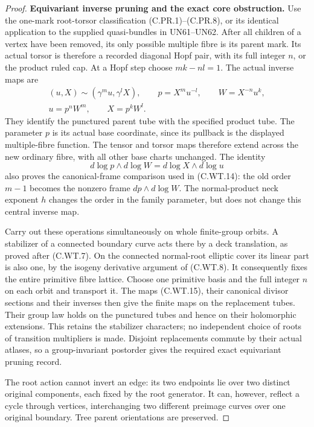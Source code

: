 \begin{proof}
\par\medskip\noindent\textbf{Equivariant inverse pruning and the exact core obstruction.}
Use the one-mark root-torsor classification
(C.PR.1)--(C.PR.8), or its identical application
to the supplied quasi-bundles in UN61--UN62.
After all children of a vertex have been
removed, its only possible multiple fibre
is its parent mark. Its actual torsor is
therefore a recorded diagonal Hopf pair,
with its full integer \(n\), or the product
ruled cap. At a Hopf step choose
\(mk-nl=1\). The actual inverse maps are
\[
 \begin{gathered}
 (u,X)\sim(\gamma^m u,\gamma^lX),\qquad
 p=X^m u^{-l},\qquad W=X^{-n}u^k,\\
                       u=p^nW^m,\qquad X=p^kW^l.
 \end{gathered}
 \tag{C.WT.15}
\]
They identify the punctured parent tube
with the specified product tube. The
parameter \(p\) is its actual base
coordinate, since its pullback is the
displayed multiple-fibre function.
The tensor and torsor maps therefore
extend across the new ordinary fibre,
with all other base charts unchanged.
The identity
\[
             d\log p\wedge d\log W
                         =d\log X\wedge d\log u
 \tag{C.WT.16}
\]
also proves the canonical-frame comparison
used in (C.WT.14): the old order \(m-1\)
becomes the nonzero frame \(dp\wedge
d\log W\). The normal-product neck
exponent \(h\) changes the order in the
family parameter, but does not change
this central inverse map.

Carry out these operations simultaneously
on whole finite-group orbits. A stabilizer
of a connected boundary curve acts there
by a deck translation, as proved after
(C.WT.7). On the connected normal-root
elliptic cover its linear part is also
one, by the isogeny derivative argument
of (C.WT.8). It consequently fixes the
entire primitive fibre lattice. Choose
one primitive basis and the full integer
\(n\) on each orbit and transport it.
The maps (C.WT.15), their canonical
divisor sections and their inverses
then give the finite maps on the
replacement tubes. Their group law
holds on the punctured tubes and hence
on their holomorphic extensions.
This retains the stabilizer characters;
no independent choice of roots of
transition multipliers is made.
Disjoint replacements commute by their
actual atlases, so a group-invariant
postorder gives the required exact
equivariant pruning record.

The root action cannot invert an edge:
its two endpoints lie over two distinct
original components, each fixed by the
root generator. It can, however, reflect
a cycle through vertices, interchanging
two different preimage curves over one
original boundary. Tree parent
orientations are preserved.


\end{proof}
